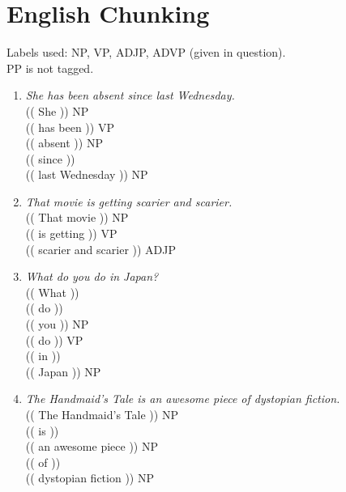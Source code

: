 \documentclass[11pt,a4paper,twocolumn]{article}
\begin{document}
	\section{English Chunking}
	Labels used: NP, VP, ADJP, ADVP (given in question). \\
	PP is not tagged. \\
	\begin{enumerate}
	\item \textit{She has been absent since last Wednesday.}\\
	$ $\\
	\textcolor{diff}{(( She ))} NP \\ 
	\textcolor{diff}{(( has been ))} VP\\
	\textcolor{diff}{(( absent ))} NP\\
	\textcolor{diff}{(( since ))} \\
	\textcolor{diff}{(( last Wednesday ))} NP\\
	
	
	\item \textit{That movie is getting scarier and scarier.}\\
	$ $\\
	\textcolor{diff}{(( That movie ))} NP\\
	\textcolor{diff}{(( is getting ))} VP\\
	\textcolor{diff}{(( scarier and scarier ))} ADJP\\
	
	\item \textit{What do you do in Japan?}\\
	$ $\\
	\textcolor{diff}{(( What ))} \\
	\textcolor{diff}{(( do ))} \\
	\textcolor{diff}{(( you ))} NP\\
	\textcolor{diff}{(( do ))} VP\\
	\textcolor{diff}{(( in ))} \\
	\textcolor{diff}{(( Japan ))} NP\\
	
	\item \textit{The Handmaid’s Tale is an awesome piece of dystopian 
	fiction.}\\
	$ $\\
	\textcolor{diff}{(( The Handmaid's Tale ))} NP\\
	\textcolor{diff}{(( is ))} \\
	\textcolor{diff}{(( an awesome piece ))} NP\\
	\textcolor{diff}{(( of ))} \\
	\textcolor{diff}{(( dystopian fiction ))} NP\\
	

\end{enumerate}
\end{document}
